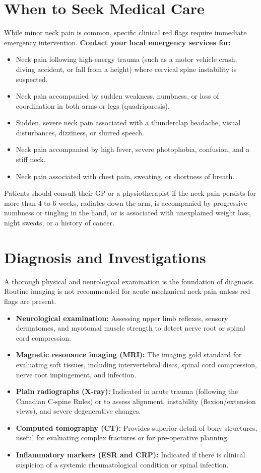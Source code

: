 \section*{When to Seek Medical Care}
While minor neck pain is common, specific clinical red flags require immediate emergency intervention.
\textbf{Contact your local emergency services for:}
\begin{itemize}
    \item Neck pain following high-energy trauma (such as a motor vehicle crash, diving accident, or fall from a height) where cervical spine instability is suspected.
    \item Neck pain accompanied by sudden weakness, numbness, or loss of coordination in both arms or legs (quadriparesis).
    \item Sudden, severe neck pain associated with a thunderclap headache, visual disturbances, dizziness, or slurred speech.
    \item Neck pain accompanied by high fever, severe photophobia, confusion, and a stiff neck.
    \item Neck pain associated with chest pain, sweating, or shortness of breath.
\end{itemize}
Patients should consult their GP or a physiotherapist if the neck pain persists for more than 4 to 6 weeks, radiates down the arm, is accompanied by progressive numbness or tingling in the hand, or is associated with unexplained weight loss, night sweats, or a history of cancer.

\section*{Diagnosis and Investigations}
A thorough physical and neurological examination is the foundation of diagnosis. Routine imaging is not recommended for acute mechanical neck pain unless red flags are present.
\begin{itemize}
    \item \textbf{Neurological examination:} Assessing upper limb reflexes, sensory dermatomes, and myotomal muscle strength to detect nerve root or spinal cord compression.
    \item \textbf{Magnetic resonance imaging (MRI):} The imaging gold standard for evaluating soft tissues, including intervertebral discs, spinal cord compression, nerve root impingement, and infection.
    \item \textbf{Plain radiographs (X-ray):} Indicated in acute trauma (following the Canadian C-spine Rules) or to assess alignment, instability (flexion/extension views), and severe degenerative changes.
    \item \textbf{Computed tomography (CT):} Provides superior detail of bony structures, useful for evaluating complex fractures or for pre-operative planning.
    \item \textbf{Inflammatory markers (ESR and CRP):} Indicated if there is clinical suspicion of a systemic rheumatological condition or spinal infection.
\end{itemize}

